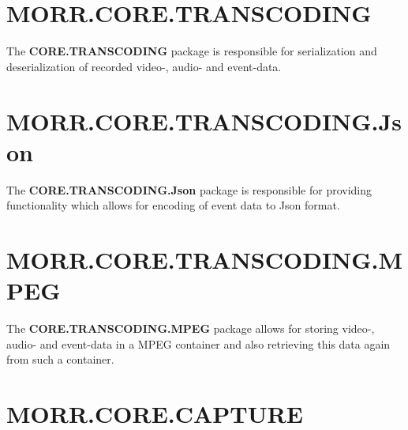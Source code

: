 \section*{MORR.CORE.TRANSCODING}

The \textbf{CORE.TRANSCODING} package is responsible for serialization and deserialization of recorded video-, audio- and event-data.

\begin{packif}
\end{packif}

\begin{packclass}
\end{packclass}

\begin{packpack}
\end{packpack}

\section*{MORR.CORE.TRANSCODING.Json}
The \textbf{CORE.TRANSCODING.Json} package is responsible for providing functionality which allows for encoding of event data to Json format.

\begin{packclass}
\end{packclass}

\section*{MORR.CORE.TRANSCODING.MPEG}
The \textbf{CORE.TRANSCODING.MPEG} package allows for storing video-, audio- and event-data in a MPEG container and also retrieving this data again from such a container.

\begin{packclass}
\end{packclass}

\section*{MORR.CORE.CAPTURE}

